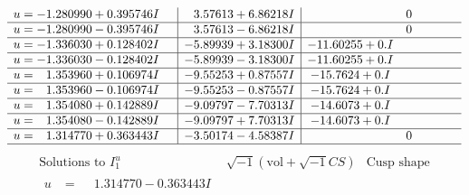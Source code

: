 \documentclass[1p]{elsarticle_modified}
\theoremstyle{definition}
\newcommand{\I}{\sqrt{-1}}
\begin{document}
$$\begin{array}{c|c|c}
\begin{aligned}
u &= -1.280990 + 0.395746 I\end{aligned}
 & \phantom{-}3.57613 + 6.86218 I & \phantom{-0.000000 } 0 \\ \hline\begin{aligned}
u &= -1.280990 - 0.395746 I\end{aligned}
 & \phantom{-}3.57613 - 6.86218 I & \phantom{-0.000000 } 0 \\ \hline\begin{aligned}
u &= -1.336030 + 0.128402 I\end{aligned}
 & -5.89939 + 3.18300 I & -11.60255 + 0. I\phantom{ +0.000000I} \\ \hline\begin{aligned}
u &= -1.336030 - 0.128402 I\end{aligned}
 & -5.89939 - 3.18300 I & -11.60255 + 0. I\phantom{ +0.000000I} \\ \hline\begin{aligned}
u &= \phantom{-}1.353960 + 0.106974 I\end{aligned}
 & -9.55253 + 0.87557 I & -15.7624 + 0. I\phantom{ +0.000000I} \\ \hline\begin{aligned}
u &= \phantom{-}1.353960 - 0.106974 I\end{aligned}
 & -9.55253 - 0.87557 I & -15.7624 + 0. I\phantom{ +0.000000I} \\ \hline\begin{aligned}
u &= \phantom{-}1.354080 + 0.142889 I\end{aligned}
 & -9.09797 - 7.70313 I & -14.6073 + 0. I\phantom{ +0.000000I} \\ \hline\begin{aligned}
u &= \phantom{-}1.354080 - 0.142889 I\end{aligned}
 & -9.09797 + 7.70313 I & -14.6073 + 0. I\phantom{ +0.000000I} \\ \hline\begin{aligned}
u &= \phantom{-}1.314770 + 0.363443 I\end{aligned}
 & -3.50174 - 4.58387 I & \phantom{-0.000000 } 0\\
 \hline 
 \end{array}$$\newpage$$\begin{array}{c|c|c}  
\text{Solutions to }I^u_{1}& \I (\text{vol} + \sqrt{-1}CS) & \text{Cusp shape}\\
 \hline 
\begin{aligned}
u &= \phantom{-}1.314770 - 0.363443 I\end{aligned}

\end{array}$$
\end{document}
